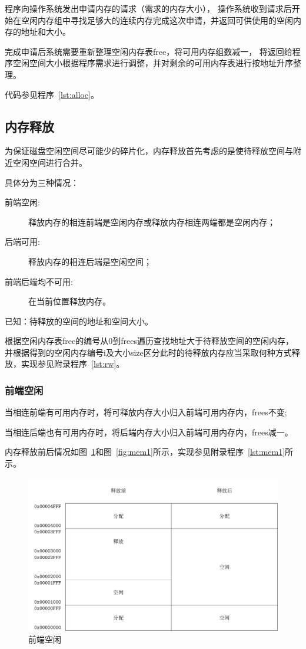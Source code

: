 程序向操作系统发出申请内存的请求（需求的内存大小），
操作系统收到请求后开始在空闲内存组中寻找足够大的连续内存完成这次申请，并返回可供使用的空闲内存的地址和大小。

完成申请后系统需要重新整理空闲内存表free，将可用内存组数减一，
将返回给程序空闲空间大小根据程序需求进行调整，并对剩余的可用内存表进行按地址升序整理。

代码参见程序~\ref{lst:alloc}。


\subsection{内存释放}

为保证磁盘空闲空间尽可能少的碎片化，内存释放首先考虑的是使待释放空间与附近空闲空间进行合并\cite{bryant2003computer}。

具体分为三种情况：

\begin{description}
\item[前端空闲:]释放内存的相连前端是空闲内存或释放内存相连两端都是空闲内存；
\item[后端可用:]释放内存的相连后端是空闲空间；
\item[前端后端均不可用:]在当前位置释放内存。
\end{description}

\newpage

已知：待释放的空间的地址和空间大小。

根据空闲内存表free的编号从0到frees遍历查找地址大于待释放空间的空闲内存，
并根据得到的空闲内存编号i及大小size区分此时的待释放内存应当采取何种方式释放，实现参见附录程序~\ref{lst:rw}。

\subsubsection{前端空闲}

当相连前端有可用内存时，将可释放内存大小归入前端可用内存内，frees不变;

当相连后端也有可用内存时，将后端内存大小归入前端可用内存内，frees减一。

内存释放前后情况如图~\ref{fig:mem0}和图~\ref{fig:mem1}所示，实现参见附录程序~\ref{lst:mem1}所示。

\begin{figure}[h]
  \centering
  \includegraphics[width=.7\textwidth]{../Fig/mem0.pdf}
  \caption{前端空闲}
  \label{fig:mem0}
\end{figure}

